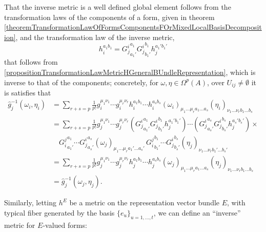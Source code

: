 That the inverse metric is a well defined global element follows from the transformation laws of the components of a form, given in theorem \ref{theoremTransformationLawOfFormsComponentsFOrMixedLocalBasisDecomposition}, and the transformation law of the inverse metric,
\begin{equation}
    h_i^{a_1 b_1} = {G^i_j}^{a_1}_{a_1'} {G^i_j}^{b_1}_{b_1'} h_j^{a_1' b_1'}
\end{equation}
that follows from \ref{propositionTransformationLawMetricHGeneralBUndleRepresentation}, which is inverse to that of the components; concretely, for $\omega, \eta \in \Omega^p(A)$, over $U_{ij} \neq \emptyset$ it is satisfies that
\begin{align*}
    \hat g_j^{-1}(\omega_i, \eta_i) 
        &= \sum_{r+s = p} \frac{1}{p!} g_i^{\mu_1 \nu_1} \cdots g_i^{\mu_r \nu_r} h_i^{a_1 b_1} \cdots h_i^{a_s b_s} (\omega_i)_{\mu_1 \dots \mu_r a_1 \dots a_s} (\eta_i)_{\nu_1 \dots \nu_r b_1 \dots  b_s}\\
        &= \sum_{r+s = p} \frac{1}{p!} g_j^{\mu_1 \nu_1} \cdots g_j^{\mu_r \nu_r} 
        ({G^i_j}^{a_1}_{a_1'} {G^i_j}^{b_1}_{b_1'} h_j^{a_1' b_1'}) \cdots 
        ({G^i_j}^{a_s}_{a_s'} {G^i_j}^{b_s}_{b_s'} h_j^{a_s' b_s'}) \times \\
         &\quad  {G^j_i}^{a_1}_{a_1'}\cdots {G^i_j}^{a_s}_{a_s'} (\omega_j)_{\mu_1 \dots \mu_r a_1' \dots a_s'} \, {G^j_i}^{b_1}_{b_1'}\cdots {G^i_j}^{b_s}_{b_s'} (\eta_j)_{\nu_1 \dots \nu_r b_1' \dots  b_s'}\\
        &= \sum_{r+s = p} \frac{1}{p!} g_j^{\mu_1 \nu_1} \cdots g_j^{\mu_r \nu_r} h_j^{a_1 b_1} \cdots h_j^{a_s b_s} (\omega_j)_{\mu_1 \dots \mu_r a_1 \dots a_s} (\eta_j)_{\nu_1 \dots \nu_r b_1 \dots  b_s}\\
        &= \hat g_j^{-1}(\omega_j, \eta_j) .
\end{align*}

Similarly, letting $h^E$ be a metric on the representation vector bundle $E$, with typical fiber generated by the basis $\{e_u\}_{u = 1, \dots, t}$, we can define an ``inverse'' metric for $E$-valued forms:

